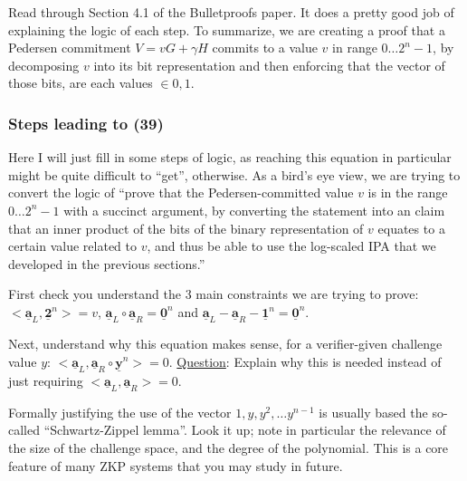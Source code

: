 \documentclass[10pt,a4paper]{article}
\begin{document}
\vspace{5 pt}

Read through Section 4.1 of the Bulletproofs paper. It does a pretty good job of explaining the logic of each step. To summarize, we are creating a proof that a Pedersen commitment $V = vG + \gamma H$ commits to a value $v$ in range $0 \ldots 2^{n}-1$, by decomposing $v$ into its bit representation and then enforcing that the vector of those bits, are each values $\in {0,1}$.

\subsubsection{Steps leading to (39)}

Here I will just fill in some steps of logic, as reaching this equation in particular might be quite difficult to ``get'', otherwise. As a bird's eye view, we are trying to convert the logic of ``prove that the Pedersen-committed value $v$ is in the range $ 0 \ldots 2^{n} -1$ with a succinct argument, by converting the statement into an claim that an inner product of the bits of the binary representation of $v$ equates to a certain value related to $v$, and thus be able to use the log-scaled IPA that we developed in the previous sections.''

\vspace{5 pt}

First check you understand the 3 main constraints we are trying to prove: $<\underline{\textbf{a}}_L, \underline{\textbf{2}}^n> = v$, $\underline{\textbf{a}}_L \circ \underline{\textbf{a}}_R = \underline{\textbf{0}}^n$ and $\underline{\textbf{a}}_L - \underline{\textbf{a}}_R - \underline{\textbf{1}}^n = \underline{\textbf{0}}^n$.

\vspace{5 pt}

Next, understand why this equation makes sense, for a verifier-given challenge value $y$: $<\underline{\textbf{a}}_L, \underline{\textbf{a}}_R \circ \underline{\textbf{y}}^n> = 0$. \underline{Question}: Explain why this is needed instead of just requiring $<\underline{\textbf{a}}_L,\underline{\textbf{a}}_R> = 0$.

\vspace{5 pt}

Formally justifying the use of the vector $1, y, y^2, \ldots y^{n-1}$ is usually based the so-called ``Schwartz-Zippel lemma''. Look it up; note in particular the relevance of the size of the challenge space, and the degree of the polynomial. This is a core feature of many ZKP systems that you may study in future.
\end{document}
